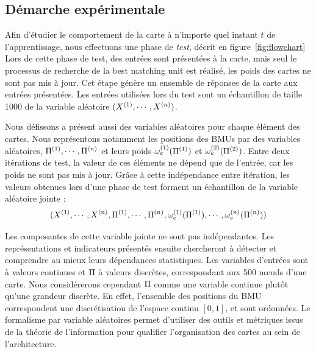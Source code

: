 \subsection{Démarche expérimentale}

Afin d'étudier le comportement de la carte à n'importe quel instant $t$ de l'apprentissage, nous effectuons une phase de \emph{test}, décrit en figure~\ref{fig:flowchart}
Lors de cette phase de test, des entrées sont présentées à la carte, mais seul le processus de recherche de la best matching unit est réalisé, les poids des cartes ne sont pas mis à jour. Cet étape génère un ensemble de réponses de la carte aux entrées présentées.
Les entrées utilisées lors du test sont un échantillon de taille 1000 de la variable aléatoire $(X^{({1})}, \cdots, X^{({n})})$.

Nous défissons a présent aussi des variables aléatoires pour chaque élément des cartes.
Nous représentons notamment les positions des BMUs par des variables aléatoires, $\Pi^{({1})}, \cdots, \Pi^{({n})}$ et leurs poids $\omega_{e}^{({1})}(\Pi^{({1})})$ et $\omega_{e}^{({2})}(\Pi^{({2})})$. 
Entre deux itérations de test, la valeur de ces éléments ne dépend que de l'entrée, car les poids ne sont pas mis à jour. Grâce à cette indépendance entre itération, les valeurs obtenues lors d'une phase de test forment un échantillon de la variable aléatoire jointe : 
$$(X^{({1})}, \cdots, X^{({n})}, \Pi^{({1})}, \cdots, \Pi^{({n})}, \omega_e^{({1})}(\Pi^{({1})}), \cdots, \omega_e^{({n})}(\Pi^{({n})}))$$

Les composantes de cette variable jointe ne sont pas indépendantes. Les représentations et indicateurs présentés ensuite chercheront à détecter et comprendre au mieux leurs dépendances statistiques.
Les variables d'entrées sont à valeurs continues et $\Pi$ à valeurs discrètes, correspondant aux 500 n\oe{}uds d'une carte. Nous considérerons cependant $\Pi$ comme une variable continue plutôt qu'une grandeur discrète. En effet, l'ensemble des positions du BMU correspondent une discrétisation de l'espace continu $[0,1]$, et sont ordonnées.
Le formalisme par variable aléatoires permet d'utiliser des outils et métriques issus de la théorie de l'information pour qualifier l'organisation des cartes au sein de l'architecture.

